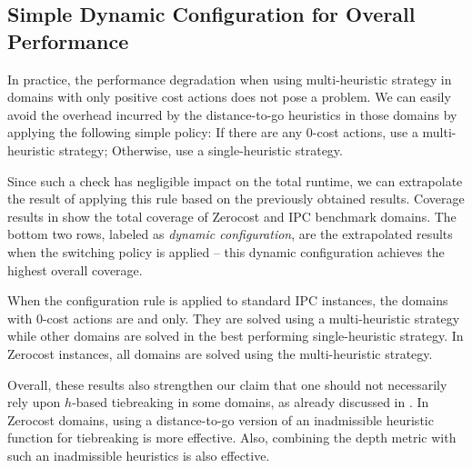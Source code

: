 \clearpage

\subsection{Simple Dynamic Configuration for Overall Performance}

In practice, the performance degradation when using multi-heuristic strategy in domains with only positive cost actions does not pose a problem.
We can easily avoid the overhead incurred by the distance-to-go heuristics in those domains by applying the following simple policy:
If there are any 0-cost actions, use a multi-heuristic strategy; Otherwise, use a single-heuristic strategy.

Since such a check has negligible impact on the total runtime, we can extrapolate the result of applying this rule based on the previously obtained results.
Coverage results in  show the total coverage of
Zerocost and IPC benchmark domains. The bottom two rows, labeled as \emph{dynamic configuration},
are the extrapolated results when the switching policy is applied -- this dynamic configuration achieves the highest overall coverage.

\begin{table}[htbp]
 \centering 
 \caption{
 Summary Results: Coverage comparison, the total of IPC domains and Zerocost domains (the number of instances
 solved in 5min, 4GB) between several sorting strategies, plus a dynamic configuration strategy.  $[f,h,\fifo],
 [f,h,\ro], [f,\hh,\mit{default}], [f,h, \hh,\mit{default}], [f,\ffo,\mit{default}]$ are not shown because they achieve smaller coverage.
 }
 \label{tbl:dtg-summary-sum}
\end{table}

When the configuration rule is applied to standard IPC instances, the domains with 0-cost actions are  and  only. They are solved using a multi-heuristic strategy while other domains are solved in the best performing single-heuristic strategy. In Zerocost instances, all domains are solved using the multi-heuristic strategy.



Overall, these results also strengthen our claim that one should not necessarily rely upon $h$-based
tiebreaking in some
domains, as already discussed in . In Zerocost domains,
using a distance-to-go version of an inadmissible heuristic function for
tiebreaking is more effective. Also, combining the depth metric with
such an inadmissible heuristics is also effective.
